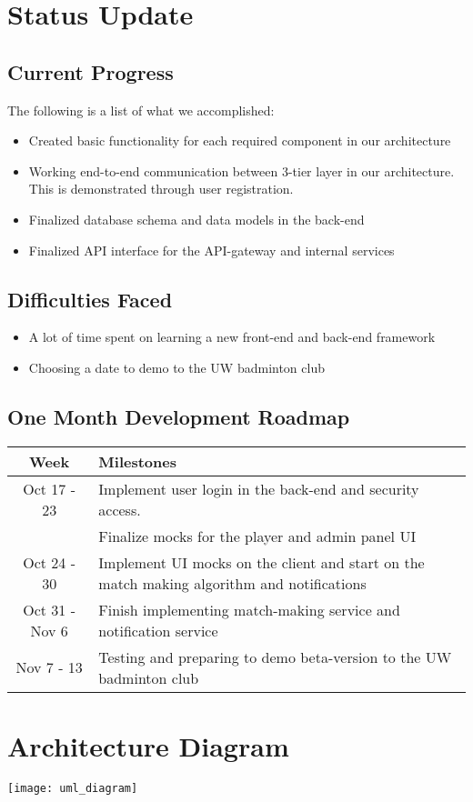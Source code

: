 \documentclass{article}
\begin{document}
\section{Status Update}

\subsection{Current Progress}
The following is a list of what we accomplished:
\begin{itemize}
  \item Created basic functionality for each required component in our architecture
  \item Working end-to-end communication between 3-tier layer in our architecture. This is demonstrated through user registration.
  \item Finalized database schema and data models in the back-end
  \item Finalized API interface for the API-gateway and internal services
\end{itemize}

\subsection{Difficulties Faced}
\begin{itemize}
  \item A lot of time spent on learning a new front-end and back-end framework
  \item Choosing a date to demo to the UW badminton club
\end{itemize}

\subsection{One Month Development Roadmap}
\begin{center}
  \begin{tabular}{ c | l }
    Week & Milestones \\
    \hline
    Oct 17 - 23 & Implement user login in the back-end and security access. \\ & Finalize mocks for the player and admin panel UI \\
    Oct 24 - 30 &  Implement UI mocks on the client and start on the match making algorithm and notifications \\
    Oct 31 - Nov 6 & Finish implementing match-making service and notification service \\
    Nov 7 - 13 & Testing and preparing to demo beta-version to the UW badminton club \\
  \end{tabular}
\end{center}

\newpage

\section{Architecture Diagram}
\texttt{[image: uml\_diagram]}
\end{document}
